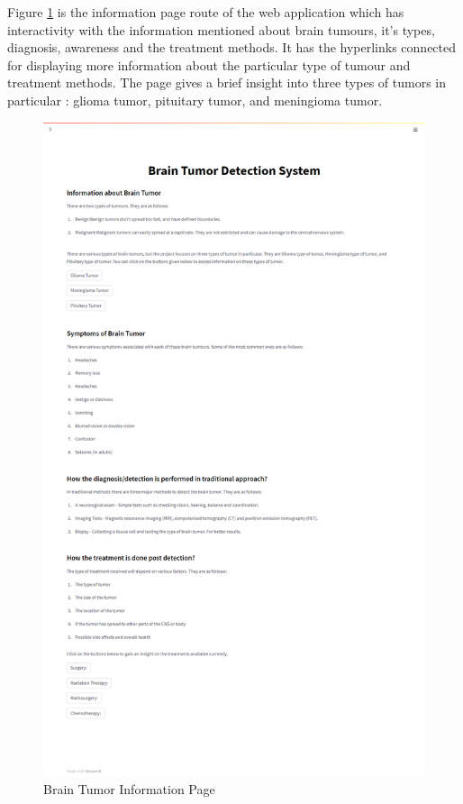 Figure \ref{fig:page2} is the information page route of the web application which has interactivity with the information mentioned about brain tumours, it's types, diagnosis, awareness and the treatment methods. It has the hyperlinks connected for displaying more information about the particular type of tumour and treatment methods. The page gives a brief insight into three types of tumors in particular : glioma tumor, pituitary tumor, and meningioma tumor.
\begin{figure}[H]
\includegraphics[scale=0.3]{Photos/Page2.png}
\caption{Brain Tumor Information Page} \label{fig:page2}
\end{figure}

